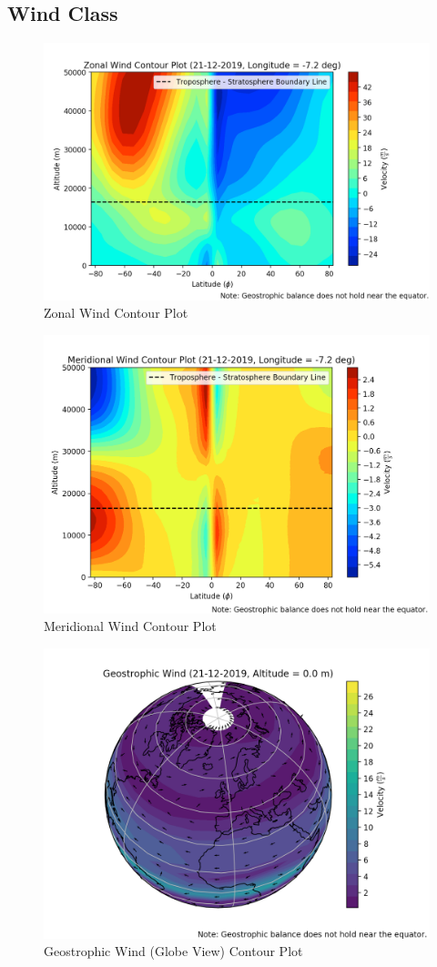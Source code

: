 \begin{appendices}
    \subsection{Wind Class}
    \begin{figure}[H]
        \centering
        \includegraphics[width=.8\linewidth]{Graphs/contour_plots/zonal_wind.png}
        \caption{Zonal Wind Contour Plot}
    \end{figure}
    
    \begin{figure}[H]
        \centering
        \includegraphics[width=.8\linewidth]{Graphs/contour_plots/meridional_wind.png}
        \caption{Meridional Wind Contour Plot}
    \end{figure}
    
    \begin{figure}[H]
        \centering
        \includegraphics[width=.8\linewidth]{Graphs/contour_plots/globe.png}
        \caption{Geostrophic Wind (Globe View) Contour Plot}
    \end{figure}
    

\end{appendices}
